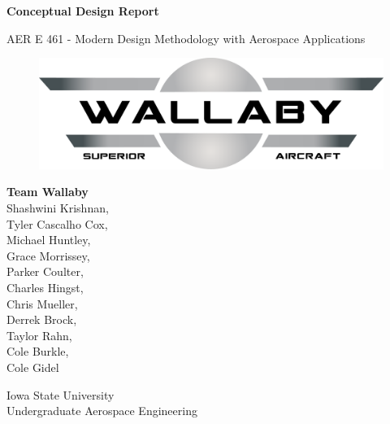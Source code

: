 \documentclass[12pt]{article}
\begin{document}
\begin{titlepage}
    \begin{center}
        \vspace*{1cm}
            
        \LARGE
        \textbf{Conceptual Design Report}
            
        \vspace{0.5cm}
        \Large
        AER E 461 - Modern Design Methodology with Aerospace Applications 
            
        \vspace{0.5 cm}
    \begin{figure}[h]
        \includegraphics[width=16 cm]{Team_Wallaby_Logo.png}
        \centering
    \end{figure}
    \vspace{0.5 cm}
        \large
        \textbf{Team Wallaby}\\
        \normalsize\vspace{15 pt}        Shashwini Krishnan,\\        
        Tyler Cascalho Cox,\\
        Michael Huntley,\\
        Grace Morrissey,\\
        Parker Coulter,\\
        Charles Hingst,\\
        Chris  Mueller,\\
        Derrek Brock,\\
        Taylor Rahn,\\
        Cole Burkle,\\
        Cole Gidel\\
        
            
        \vfill
            
            
        \vspace{0.8cm}
            
            
        \Large
        Iowa State University\\
        Undergraduate Aerospace Engineering
        
            
    \end{center}
\end{titlepage}
\end{document}
